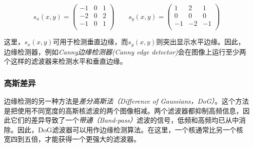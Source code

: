 \begin{equation}
s_x(x,y)=
\left(
\begin{array}{ccc}
-1 & 0 & 1\\
-2 & 0 & 2\\
-1 & 0 & 1\\
\end{array}
\right)
\qquad
s_y(x,y)=
\left(
\begin{array}{ccc}
1 & 2 & 1\\
0 & 0 & 0\\
-1 & -2 & -1\\
\end{array}
\right)
\end{equation}


这里，$s_x(x,y)$可用于检测垂直边缘，而$s_y(x,y)$则突出显示水平边缘。因此，边缘检测器，例如\emph{Canny边缘检测器(Canny edge detector)}会在图像上运行至少两个这样的滤波器来检测水平和垂直边缘。


\subsubsection{高斯差异}
边缘检测的另一种方法是\emph{差分高斯法（Difference of Gaussians，DoG）}。这个方法是把使用不同宽度的高斯核滤波的两个图像相减。两个滤波器都抑制高频信息，因此它们的差异导致了一个\emph{带通（Band-pass）}滤波的信号，低频和高频均已从中消除。因此，DoG滤波器可以用作边缘检测算法。在这里，一个核通常比另一个核宽四到五倍，才能获得一个更强大的滤波器。

